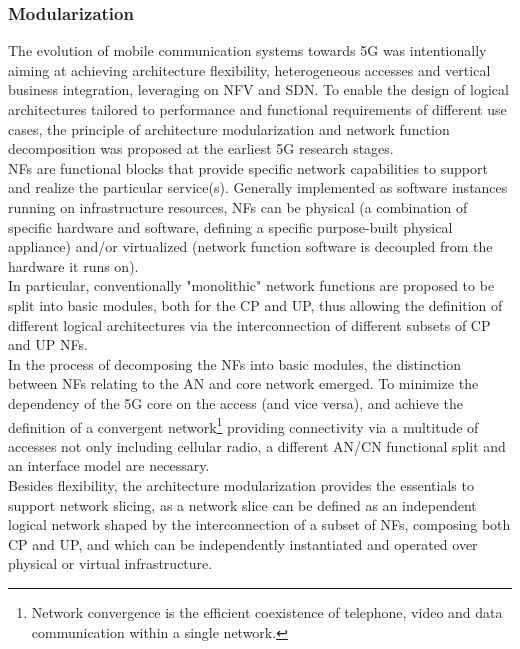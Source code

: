 \documentclass[a4paper,12pt]{report} %
\begin{document}
\subsubsection{Modularization}
The evolution of mobile communication systems towards 5G was intentionally aiming at achieving
architecture flexibility, heterogeneous accesses and vertical business integration, leveraging on NFV and SDN. To enable the design of logical architectures tailored to
performance and functional requirements of different use cases, the principle of architecture
modularization and network function decomposition was proposed at the earliest 5G research
stages.\\ 
\gls{NF}s are functional blocks
that provide specific network capabilities to support and realize the particular service(s). Generally implemented
as software instances running on infrastructure
resources, NFs can be physical (a combination
of specific hardware and software, defining a specific purpose-built physical appliance)
and/or virtualized (network function software is
decoupled from the hardware it runs on). \\
In particular, conventionally "monolithic" network functions are proposed to be split into basic modules, both for the \gls{CP} and \gls{UP}, thus allowing the definition of different logical architectures via the interconnection of
different subsets of CP and UP NFs.\\
In the process of decomposing the NFs into basic modules, the distinction between NFs relating to
the \gls{AN} and core network emerged. To minimize the dependency of the 5G
core on the access (and vice versa), and achieve the definition of a convergent network\footnote{Network convergence is the efficient coexistence of telephone, video and data communication within a single network.} providing
connectivity via a multitude of accesses not only including cellular radio, a different AN/CN functional split and an interface model are necessary.\\
Besides flexibility, the architecture modularization provides the essentials to support network
­slicing, as a network slice can be defined as an independent logical network shaped by the interconnection of a subset of NFs, composing both CP and UP, and which can be independently instantiated
and operated over physical or virtual infrastructure.
\end{document}
